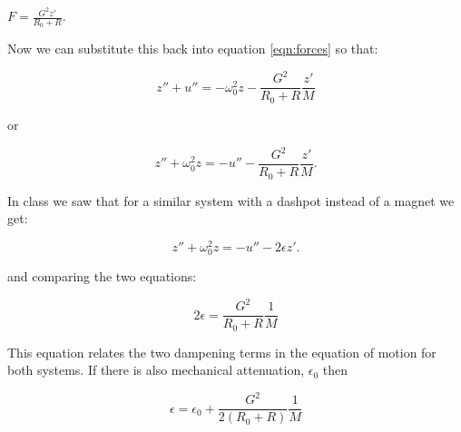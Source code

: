 \documentclass[overlapped,line,letterpaper]{res}
\begin{document}
\begin{resume}
$F = \frac{G^2z'}{R_0+R}$.

Now we can substitute this back into equation \ref{eqn:forces} so that:

\begin{equation}
	z'' + u'' = -\omega_0^2 z - \frac{G^2}{R_0+R}\frac{z'}{M}
\end{equation}
	
or

\begin{equation}
	z'' + \omega_0^2 z  = -u'' - \frac{G^2}{R_0+R}\frac{z'}{M}.
\end{equation}

In class we saw that for a similar system with a dashpot instead of a magnet we get: 


\begin{equation}
	z'' + \omega_0^2 z  = -u'' - 2\epsilon z'.
\end{equation}

and comparing the two equations:

\begin{equation}
	2\epsilon = \frac{G^2}{R_0+R}\frac{1}{M}
\end{equation}

This equation relates the two dampening terms in the equation of motion for both systems. If there is also mechanical attenuation, $\epsilon_{0}$ then

\begin{equation}
	\epsilon = \epsilon_0 + \frac{G^2}{2(R_0+R)}\frac{1}{M}
\end{equation}

\end{resume}
\end{document}
